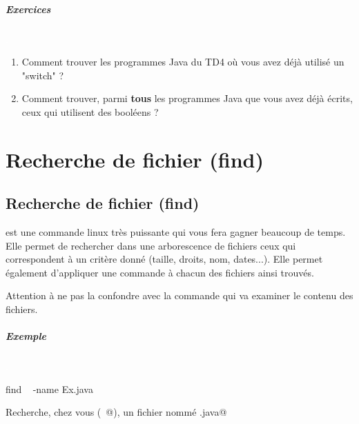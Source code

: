 \documentclass[11pt,a4paper]{article}
\begin{document}
			
		\subparagraph{Exercices} 
		
					\textcolor{white}{.} \par
				
					\begin{enumerate}
				
			\item 
							Comment trouver les programmes Java
							du TD4
							o\`u vous avez d\'ej\`a utilis\'e un "switch" ?
						
			\item 
							Comment trouver,
							parmi \textbf{tous}
							les programmes Java
							que vous avez d\'ej\`a \'ecrits,
							ceux qui utilisent des bool\'eens ?
						
					\end{enumerate}
				
			\par\medskip
            \par
        \section{Recherche de fichier (find)}\subsection{Recherche de fichier (find)}\verb@find@ est une commande linux 
				tr\`es puissante qui vous fera gagner beaucoup de temps.
				Elle permet de rechercher dans une arborescence de fichiers 
				ceux qui correspondent \`a un crit\`ere donn\'e 
				(taille, droits, nom, dates...).
				Elle permet \'egalement d'appliquer une commande \`a chacun 
				des fichiers ainsi trouv\'es.
			
            \par
        
				Attention \`a ne pas la confondre
				avec la commande
				\verb@grep@
				qui va examiner le contenu des fichiers.
			
            \par
        
			
		\subparagraph{Exemple} 
		
					\textcolor{white}{.} \par
				
            \par
        \begin{Java}
find ~ -name Ex.java
			\end{Java}
				Recherche, chez vous 
				(\verb@~@),
				un fichier nomm\'e 
				\verb@Ex.java@
            \par
        
\end{document}
